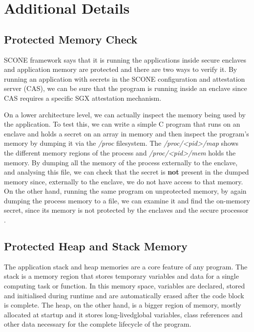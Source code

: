 \section{Additional Details}
\label{sec:additional_details}

\subsection{Protected Memory Check}
\label{ssec:protected_memory_check}

SCONE framework says that it is running the applications inside secure enclaves and application memory are protected and there are two ways to verify it. By running an application with secrets in the SCONE configuration and attestation server (\gls{CAS}), we can be sure that the program is running inside an enclave since CAS requires a specific \gls{SGX} attestation mechanism. 

On a lower architecture level, we can actually inspect the memory being used by the application. To test this, we can write a simple C program that runs on an enclave and holds a secret on an array in memory and then inspect the program's memory by dumping it via the \textit{/proc} filesystem. The \textit{/proc/<pid>/map} shows the different memory regions of the process and \textit{/proc/<pid>/mem} holds the memory. By dumping all the memory of the process externally to the enclave, and analysing this file, we can check that the secret is \textbf{not} present in the dumped memory since, externally to the enclave, we do not have access to that memory. On the other hand, running the same program on unprotected memory, by again dumping the process memory to a file, we can examine it and find the on-memory secret, since its memory is not protected by the enclaves and the secure processor \cite{scone:debug}.

\subsection{Protected Heap and Stack Memory}
\label{ssec:protected_heap_and_stack_memory}

The application stack and heap memories are a core feature of any program. The stack is a memory region that stores temporary variables and data for a single computing task or function. In this memory space, variables are declared, stored and initialised during runtime and are automatically erased after the code block is complete. The heap, on the other hand, is a bigger region of memory, mostly allocated at startup and it stores long-livedglobal variables, class references and other data necessary for the complete lifecycle of the program.

